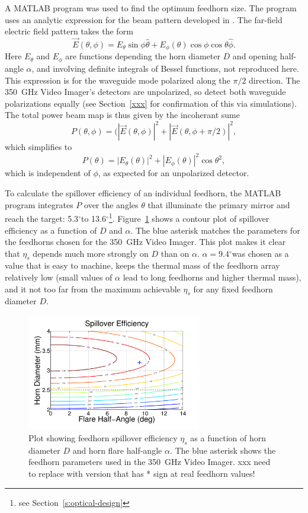 \documentclass[10pt,twocolumn,article]{memoir}
\newcommand*{\figref}[1]{Figure~\ref{#1}}
\newcommand*{\sectionref}[1]{Section~\ref{#1}}
\newcommand*{\MATLAB}{{\small MATLAB}\xspace}
\newcommand*{\Imager}{350~GHz Video Imager\xspace}
\newcommand*{\vect}[1]{\vec{#1}}
\newcommand*{\textdegree}{\ensuremath{^{\circ}}}
\begin{document}
A \MATLAB program was used to find the optimum feedhorn size.
The program uses an analytic expression for the beam pattern developed in \cite{green2006radiation,narasimhan1971modes,}.
The far-field electric field pattern takes the form
\[
    \vect{E}(\theta,\phi) = E_{\theta} \sin{\phi} \hat{\theta} + E_{\phi}(\theta) \cos{\phi} \cos{\theta} \hat{\phi}.
\]
Here $E_{\theta}$ and $E_{\phi}$ are functions depending the horn diameter $D$ and opening half-angle $\alpha$, and involving definite integrals of Bessel functions, not reproduced here.
This expression is for the waveguide mode polarized along the $\pi/2$ direction.
The \Imager's detectors are unpolarized, so detect both waveguide polarizations equally (see \sectionref{xxx} for confirmation of this via simulations).
The total power beam map is thus given by the incoherant sume
\[
    P(\theta, \phi) = (|\vect{E}(\theta, \phi)|^2 + |\vect{E}(\theta, \phi+\pi/2)|^2,
\] 
which simplifies to 
\[
    P(\theta) = |E_{\theta}(\theta)|^2 + |E_{\phi}(\theta)|^2 \cos{\theta}^2,
\]
which is independent of $\phi$, as expected for an unpolarized detector.

To calculate the spillover efficiency of an individual feedhorn, the \MATLAB program integrates $P$ over the angles $\theta$ that illuminate the primary mirror and reach the target: 5.3\textdegree to 13.6\textdegree\footnote{see \sectionref{s:optical-design}}.
\figref{fig:spill-vs-alpha-diam} shows a contour plot of spillover efficiency as a function of $D$ and $\alpha$.
The blue asterisk matches the parameters for the feedhorns chosen for the \Imager.
This plot makes it clear that $\eta_s$ depends much more strongly on $D$ than on $\alpha$.
$\alpha = 9.4$\textdegree was chosen as a value that is easy to machine, keeps the thermal mass of the feedhorn array relatively low (small values of $\alpha$ lead to long feedhorns and higher thermal mass), and it not too far from the maximum achievable $\eta_s$ for any fixed feedhorn diameter $D$.

\begin{figure}[th]
\centering
\includegraphics[width=3.0in]{images/spill_vs_alpha_diam.pdf}
\caption{Plot showing feedhorn spillover efficiency $\eta_s$ as a function of horn diameter $D$ and horn flare half-angle $\alpha$. The blue asterisk shows the feedhorn parameters used in the \Imager. xxx need to replace with version that has * sign at real feedhorn values!}
\label{fig:spill-vs-alpha-diam}
\end{figure}
\end{document}
